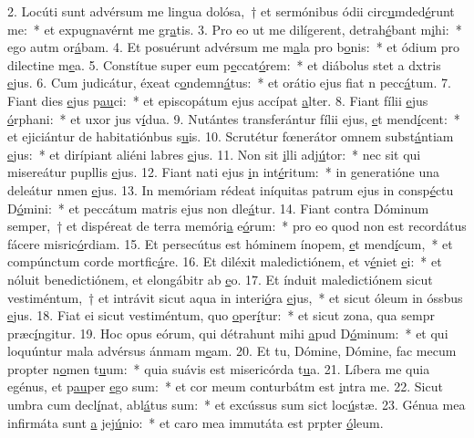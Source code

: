 2. Locúti sunt advérsum me lingua dolósa,~† et sermónibus ódii circ\uline{u}mded\uline{é}runt me:~* et expugnavérnt me gr\uline{a}tis.
3. Pro eo ut me dilígerent, detrah\uline{é}bant m\uline{i}hi:~* ego autm or\uline{á}bam.
4. Et posuérunt advérsum me m\uline{a}la pro b\uline{o}nis:~* et ódium pro dilectine m\uline{e}a.
5. Constítue super eum p\uline{e}ccat\uline{ó}rem:~* et diábolus stet a dxtris \uline{e}jus.
6. Cum judicátur, éxeat c\uline{o}ndemn\uline{á}tus:~* et orátio ejus fiat n pecc\uline{á}tum.
7. Fiant dies \uline{e}jus p\uline{au}ci:~* et episcopátum ejus accípat \uline{a}lter.
8. Fiant fílii \uline{e}jus \uline{ó}rphani:~* et uxor jus v\uline{í}dua.
9. Nutántes transferántur fílii ejus, \uline{e}t mend\uline{í}cent:~* et ejiciántur de habitatiónbus s\uline{u}is.
10. Scrutétur fœnerátor omnem subst\uline{á}ntiam \uline{e}jus:~* et dirípiant aliéni labres \uline{e}jus.
11. Non sit \uline{i}lli adj\uline{ú}tor:~* nec sit qui misereátur pupllis \uline{e}jus.
12. Fiant nati ejus \uline{i}n int\uline{é}ritum:~* in generatióne una deleátur nmen \uline{e}jus.
13. In memóriam rédeat iníquitas patrum ejus in consp\uline{é}ctu D\uline{ó}mini:~* et peccátum matris ejus non dle\uline{á}tur.
14. Fiant contra Dóminum semper,~† et dispéreat de terra memóri\uline{a} e\uline{ó}rum:~* pro eo quod non est recordátus fácere misric\uline{ó}rdiam.
15. Et persecútus est hóminem ínopem, \uline{e}t mend\uline{í}cum,~* et compúnctum corde mortfic\uline{á}re.
16. Et diléxit maledictiónem, et v\uline{é}niet \uline{e}i:~* et nóluit benedictiónem, et elongábitr ab \uline{e}o.
17. Et índuit maledictiónem sicut vestiméntum,~† et intrávit sicut aqua in interi\uline{ó}ra \uline{e}jus,~* et sicut óleum in óssbus \uline{e}jus.
18. Fiat ei sicut vestiméntum, quo \uline{o}per\uline{í}tur:~* et sicut zona, qua sempr præc\uline{í}ngitur.
19. Hoc opus eórum, qui détrahunt mihi \uline{a}pud D\uline{ó}minum:~* et qui loquúntur mala advérsus ánmam m\uline{e}am.
20. Et tu, Dómine, Dómine, fac mecum propter n\uline{o}men t\uline{u}um:~* quia suávis est misericórda t\uline{u}a.
21. Líbera me quia egénus, et p\uline{au}per \uline{e}go sum:~* et cor meum conturbátm est \uline{i}ntra me.
22. Sicut umbra cum decl\uline{í}nat, abl\uline{á}tus sum:~* et excússus sum sict loc\uline{ú}stæ.
23. Génua mea infirmáta sunt \uline{a} jej\uline{ú}nio:~* et caro mea immutáta est prpter \uline{ó}leum.
